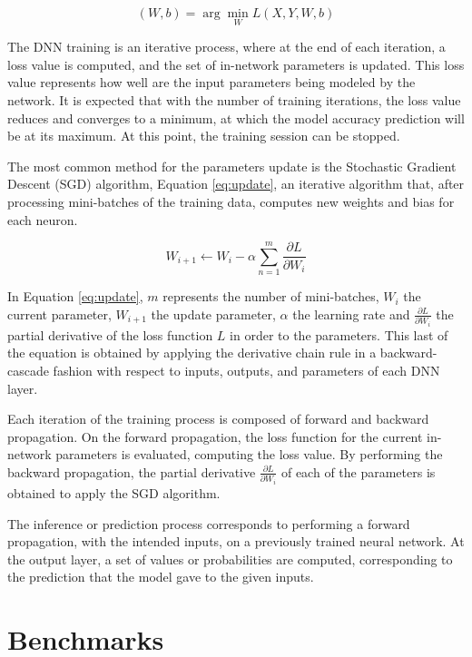 \begin{equation}
    \label{eq:loss}
    (W,b) = \arg\min_{W} L(X,Y,W,b)
\end{equation}

The DNN training is an iterative process, where at the end of each iteration, a loss value is computed, and the set of in-network parameters is updated. This loss value represents how well are the input parameters being modeled by the network. It is expected that with the number of training iterations, the loss value reduces and converges to a minimum, at which the model accuracy prediction will be at its maximum. At this point, the training session can be stopped.

The most common method for the parameters update is the Stochastic Gradient Descent (SGD) algorithm, Equation \ref{eq:update}, an iterative algorithm that, after processing mini-batches of the training data, computes new weights and bias for each neuron. 

\begin{equation}
    \label{eq:update}
    W_{i+1} \xleftarrow{} W_i - \alpha \sum_{n=1}^{m}\frac{\partial L}{\partial W_i}
\end{equation}

In Equation \ref{eq:update}, $m$ represents the number of mini-batches, $W_i$ the current parameter, $W_{i+1}$ the update parameter, $\alpha$ the learning rate and $\frac{\partial L}{\partial W_i}$ the partial derivative of the loss function $L$ in order to the parameters. This last of the equation is obtained by applying the derivative chain rule in a backward-cascade fashion with respect to inputs, outputs, and parameters of each DNN layer.

Each iteration of the training process is composed of forward and backward propagation. On the forward propagation, the loss function for the current in-network parameters is evaluated, computing the loss value. By performing the backward propagation, the partial derivative $\frac{\partial L}{\partial W_i}$ of each of the parameters is obtained to apply the SGD algorithm. 

The inference or prediction process corresponds to performing a forward propagation, with the intended inputs, on a previously trained neural network. At the output layer, a set of values or probabilities are computed, corresponding to the prediction that the model gave to the given inputs.

\section{Benchmarks}

